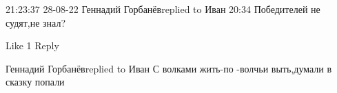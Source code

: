  
 
 
 
 

21:23:37 28-08-22
Геннадий Горбанёвreplied to Иван
20:34
Победителей не судят,не знал?

    Like 1
    Reply

Геннадий Горбанёвreplied to Иван
С волками жить-по -волчьи выть,думали в сказку попали💃
